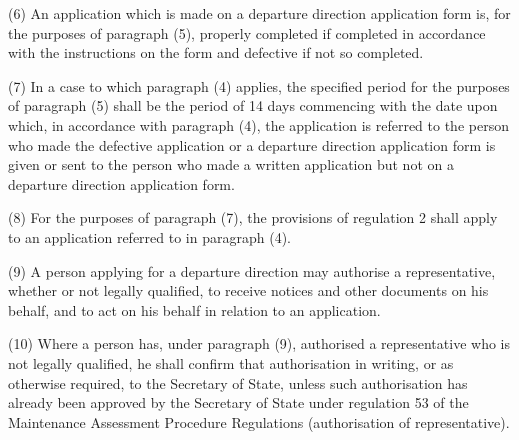 \documentclass[12pt,a4paper]{article}
\begin{document}
(6) An application which is made on a departure direction application form is,
for the purposes of paragraph (5), properly completed if completed in accordance
with the instructions on the form and defective if not so completed.

(7) In a case to which paragraph (4) applies, the specified period for the
purposes of paragraph (5) shall be the period of 14 days commencing with the
date upon which, in accordance with paragraph (4), the application is referred
to the person who made the defective application or a departure direction
application form is given or sent to the person who made a written application
but not on a departure direction application form.

(8) For the purposes of paragraph (7), the provisions of regulation 2 shall
apply to an application referred to in paragraph (4).

(9) A person applying for a departure direction may authorise a representative,
whether or not legally qualified, to receive notices and other documents on his
behalf, and to act on his behalf in relation to an application.

(10) Where a person has, under paragraph (9), authorised a representative who is
not legally qualified, he shall confirm that authorisation in writing, or as
otherwise required, to the Secretary of State, unless such authorisation has
already been approved by the Secretary of State under regulation 53 of the
Maintenance Assessment Procedure Regulations (authorisation of representative).
\end{document}
